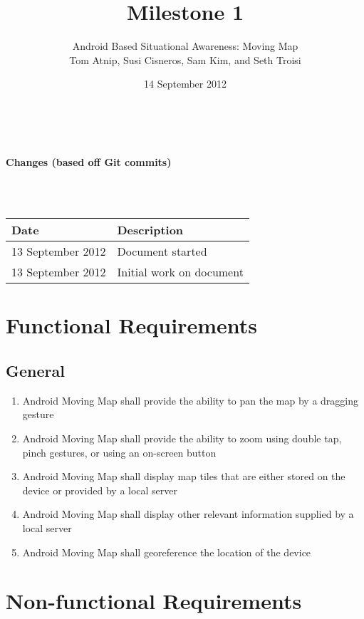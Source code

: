 \documentclass{article}
\begin{document}
\setlength{\voffset}{3.5in}
\title{Milestone 1}
\author{\Large Android Based Situational Awareness: Moving Map\\
Tom Atnip, Susi Cisneros, Sam Kim, and Seth Troisi}
\date{14 September 2012}
\maketitle
\clearpage
\setlength{\voffset}{0pt}
\tableofcontents
\clearpage
~\\
\begin{Large}\textbf{Changes (based off Git commits)}\end{Large}\\
~\\
\begin{tabular}{ | p{1.5in} | p{4.5in} | }
\hline
\textbf{Date} & \textbf{Description}\\
\hline
\hline
13 September 2012 & Document started\\
\hline
13 September 2012 & Initial work on document\\
\hline
\end{tabular}
\clearpage

\section{Functional Requirements}

\subsection{General}

\begin{enumerate}[label*=1.1.\arabic*]
\item Android Moving Map shall provide the ability to pan the map by a dragging gesture
\item Android Moving Map shall provide the ability to zoom using double tap, pinch gestures, or using an on-screen button
\item Android Moving Map shall display map tiles that are either stored on the device or provided by a local server
\item Android Moving Map shall display other relevant information supplied by a local server
\item Android Moving Map shall georeference the location of the device
\end{enumerate}


\section{Non-functional Requirements}
\end{document}
